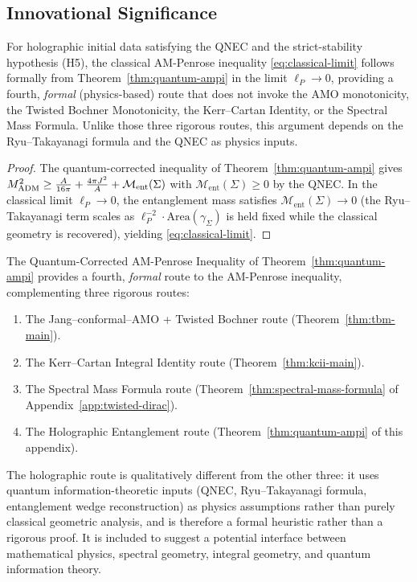 \subsection{Innovational Significance}

\begin{theorem}\label{thm:holographic-route}
For holographic initial data satisfying the QNEC and the strict-stability hypothesis (H5), the classical AM-Penrose inequality \eqref{eq:classical-limit} follows formally from Theorem~\ref{thm:quantum-ampi} in the limit $\ell_P \to 0$, providing a fourth, \emph{formal} (physics-based) route that does not invoke the AMO monotonicity, the Twisted Bochner Monotonicity, the Kerr--Cartan Identity, or the Spectral Mass Formula. Unlike those three rigorous routes, this argument depends on the Ryu--Takayanagi formula and the QNEC as physics inputs.
\end{theorem}
\begin{proof}
The quantum-corrected inequality of Theorem~\ref{thm:quantum-ampi} gives $M_{\mathrm{ADM}}^2 \geq \tfrac{A}{16\pi}+\tfrac{4\pi J^2}{A}+\mathcal{M}_{\mathrm{ent}}(\Sigma)$ with $\mathcal{M}_{\mathrm{ent}}(\Sigma)\geq 0$ by the QNEC. In the classical limit $\ell_P\to 0$, the entanglement mass satisfies $\mathcal{M}_{\mathrm{ent}}(\Sigma)\to 0$ (the Ryu--Takayanagi term scales as $\ell_P^{-2}\cdot \mathrm{Area}(\gamma_\Sigma)$ is held fixed while the classical geometry is recovered), yielding \eqref{eq:classical-limit}.
\end{proof}

\begin{remark}
The Quantum-Corrected AM-Penrose Inequality of Theorem~\ref{thm:quantum-ampi} provides a fourth, \emph{formal} route to the AM-Penrose inequality, complementing three rigorous routes:
\begin{enumerate}
\item The Jang--conformal--AMO + Twisted Bochner route (Theorem~\ref{thm:tbm-main}).
\item The Kerr--Cartan Integral Identity route (Theorem~\ref{thm:kcii-main}).
\item The Spectral Mass Formula route (Theorem~\ref{thm:spectral-mass-formula} of Appendix~\ref{app:twisted-dirac}).
\item The Holographic Entanglement route (Theorem~\ref{thm:quantum-ampi} of this appendix).
\end{enumerate}
The holographic route is qualitatively different from the other three: it uses quantum information-theoretic inputs (QNEC, Ryu--Takayanagi formula, entanglement wedge reconstruction) as physics assumptions rather than purely classical geometric analysis, and is therefore a formal heuristic rather than a rigorous proof. It is included to suggest a potential interface between mathematical physics, spectral geometry, integral geometry, and quantum information theory.
\end{remark}

